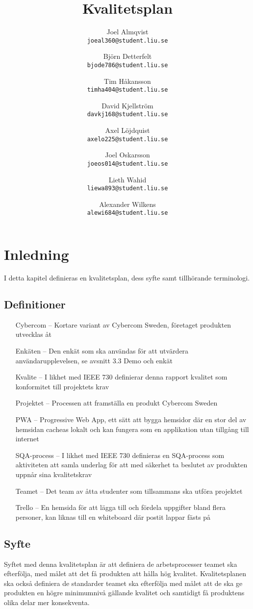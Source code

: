\documentclass[10pt]{article}
\title{Kvalitetsplan}
\author{
    Joel Almqvist\\
    \texttt{joeal360@student.liu.se}
    \and
    Björn Detterfelt\\
    \texttt{bjode786@student.liu.se}
    \and
    Tim Håkansson\\
    \texttt{timha404@student.liu.se}
    \and
    David Kjellström\\
    \texttt{davkj168@student.liu.se}
    \and
    Axel Löjdquist\\
    \texttt{axelo225@student.liu.se}
    \and
    Joel Oskarsson\\
    \texttt{joeos014@student.liu.se}
    \and
    Lieth Wahid\\
    \texttt{liewa893@student.liu.se}
    \and
    Alexander Wilkens\\
    \texttt{alewi684@student.liu.se}
}
\begin{document}
\maketitle
\pagebreak
\tableofcontents
\pagebreak
\section{Inledning}
	I detta kapitel definieras en kvalitetsplan, dess syfte samt tillhörande terminologi.

	\subsection{Definitioner}
		\begin{itemize}
		\item [Cybercom --]Kortare variant av Cybercom Sweden, företaget produkten utvecklas åt
		\item [Enkäten --]Den enkät som ska användas för att utvärdera användarupplevelsen, se avsnitt  3.3 Demo och enkät
		\item [Kvalite --]I likhet med IEEE 730 definierar denna rapport kvalitet som konformitet till projektets krav
		\item [Projektet --]Processen att framställa en produkt  Cybercom Sweden
		\item [PWA --]Progressive Web App, ett sätt att bygga hemsidor där en stor del av hemsidan cacheas lokalt och kan fungera som en applikation utan tillgång till internet
		\item [SQA-process --]I likhet med IEEE 730 definieras en SQA-process som aktiviteten att samla underlag för att med säkerhet ta beslutet av produkten uppnår sina kvalitetskrav
		\item [Teamet --]Det team av åtta studenter som tillsammans ska utföra projektet
		\item [Trello --]En hemsida för att lägga till och fördela uppgifter bland flera personer, kan liknas till en whiteboard där postit lappar fästs på
		\end{itemize}	
	
	\subsection{Syfte}
		Syftet med denna kvalitetsplan är att definiera de arbetsprocesser teamet ska efterfölja, med målet att det få produkten att hålla hög kvalitet. Kvalitetsplanen ska också definiera de standarder teamet ska efterfölja med målet att de ska ge produkten en högre minimumnivå gällande kvalitet och samtidigt få produktens olika delar mer konsekventa.
\end{document}
